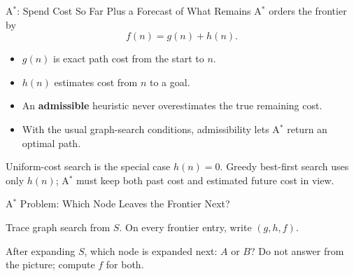 \documentclass[aspectratio=169,10pt]{beamer}
\begin{document}
\begin{frame}{A$^*$: Spend Cost So Far Plus a Forecast of What Remains}
  A$^*$ orders the frontier by
  \[
    f(n)=g(n)+h(n).
  \]
  \begin{itemize}
    \item $g(n)$ is exact path cost from the start to $n$.
    \item $h(n)$ estimates cost from $n$ to a goal.
    \item An \textbf{admissible} heuristic never overestimates the true remaining cost.
    \item With the usual graph-search conditions, admissibility lets A$^*$ return an optimal path.
  \end{itemize}
  \begin{keyidea}
    Uniform-cost search is the special case $h(n)=0$. Greedy best-first search uses only $h(n)$; A$^*$ must keep both past cost and estimated future cost in view.
  \end{keyidea}
\end{frame}

\begin{frame}{A$^*$ Problem: Which Node Leaves the Frontier Next?}
  \begin{center}
  \end{center}
  Trace graph search from $S$. On every frontier entry, write $(g,h,f)$.
  \begin{activity}
    After expanding $S$, which node is expanded next: $A$ or $B$? Do not answer from the picture; compute $f$ for both.
  \end{activity}
\end{frame}
\end{document}

